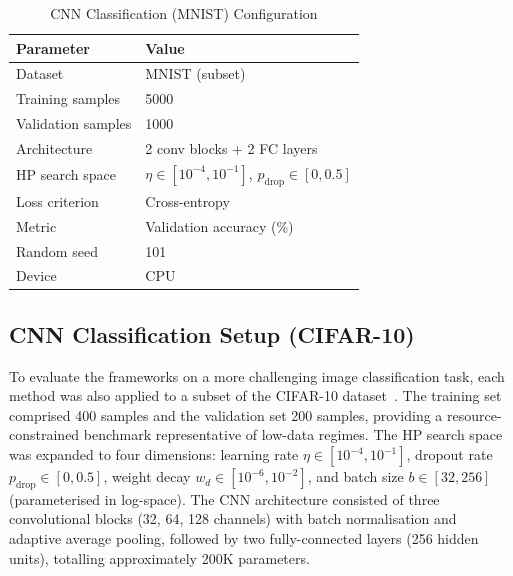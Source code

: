 \documentclass[11pt]{article}
\begin{document}
\begin{table}[H]
\centering
\caption{CNN Classification (MNIST) Configuration}
\label{tab:cnn_setup}
\renewcommand{\arraystretch}{1.2}
\begin{tabular}{ll}
\toprule
Parameter & Value \\
\midrule
Dataset              & MNIST (subset) \\
Training samples     & 5000 \\
Validation samples   & 1000 \\
Architecture         & 2 conv blocks + 2 FC layers \\
HP search space      & $\eta \in [10^{-4}, 10^{-1}]$,
                       $p_{\mathrm{drop}} \in [0, 0.5]$ \\
Loss criterion       & Cross-entropy \\
Metric               & Validation accuracy (\%) \\
Random seed          & 101 \\
Device               & CPU \\
\bottomrule
\end{tabular}
\end{table}

\subsection{CNN Classification Setup (CIFAR-10)}

To evaluate the frameworks on a more challenging image classification
task, each method was also applied to a subset of the
CIFAR-10 dataset~\cite{chrabaszcz2017downsampled}.  The training set
comprised 400 samples and the validation set 200 samples, providing a
resource-constrained benchmark representative of low-data regimes.
The HP search space was expanded to four dimensions:
learning rate $\eta \in [10^{-4}, 10^{-1}]$,
dropout rate $p_{\mathrm{drop}} \in [0, 0.5]$,
weight decay $w_d \in [10^{-6}, 10^{-2}]$, and
batch size $b \in [32, 256]$ (parameterised in log-space).
The CNN architecture consisted of three convolutional blocks (32, 64,
128 channels) with batch normalisation and adaptive average pooling,
followed by two fully-connected layers (256 hidden units),
totalling approximately 200K parameters.
\end{document}
